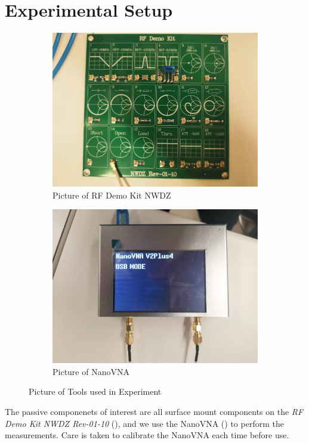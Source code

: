 \documentclass{article}
\begin{document}
\section{Experimental Setup}
\begin{figure}[h]
    \centering
    \begin{subfigure}{.5\linewidth}
        \centering
\includegraphics[width=.8\linewidth]{./pics/test_loads.jpg}
        \caption{Picture of RF Demo Kit NWDZ}
        \label{fig:test_loads}
    \end{subfigure}%
    \begin{subfigure}{.5\linewidth}
        \centering
\includegraphics[width=.8\linewidth]{./pics/NanoVNA.jpg}
        \caption{Picture of NanoVNA}
        \label{fig:nanovna}
    \end{subfigure}
\caption{Picture of Tools used in Experiment}
\end{figure}

The passive componenets of interest are all surface mount components on the \emph{RF Demo Kit NWDZ Rev-01-10} (), and
we use the NanoVNA () to perform the measurements.
Care is taken to calibrate the NanoVNA each time before use.
\end{document}

